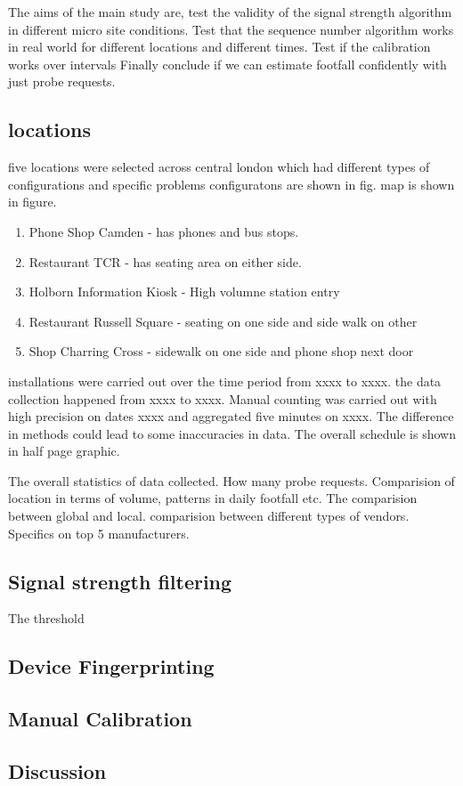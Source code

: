 The aims of the main study are,
test the validity of the signal strength algorithm in different 
micro site conditions.
Test that the sequence number algorithm works in real world
for different locations and different times.
Test if the calibration works over intervals
Finally conclude if we can estimate footfall confidently
with just probe requests.

\subsection{locations}
five locations were selected across central london which
had different types of configurations and specific problems
configuratons are shown in fig. map is shown in figure.
\begin{enumerate}
	\item Phone Shop Camden - has phones and bus stops.
	\item Restaurant TCR - has seating area on either side.
	\item Holborn Information Kiosk - High volumne station entry
	\item Restaurant Russell Square - seating on one side and side walk on other
	\item Shop Charring Cross - sidewalk on one side and phone shop next door
\end{enumerate}
installations were carried out over the time period from xxxx to xxxx.
the data collection happened from xxxx to xxxx. Manual counting was carried out
with high precision on dates xxxx and aggregated five minutes on xxxx.
The difference in methods could lead to some inaccuracies in data.
The overall schedule is shown in half page graphic.

The overall statistics of data collected. How many probe requests.
Comparision of location in terms of volume, patterns in daily footfall etc.
The comparision between global and local.
comparision between different types of vendors.
Specifics on top 5 manufacturers.

\subsection{Signal strength filtering}
The threshold 

\subsection{Device Fingerprinting}

\subsection{Manual Calibration}

\subsection{Discussion}
